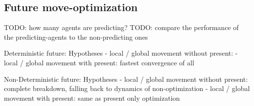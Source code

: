\subsection{Future move-optimization}
TODO: how many agents are predicting?
TODO: compare the performance of the predicting-agents to the non-predicting ones

Deterministic future:
	Hypotheses
		- local / global movement without present:  
		- local / global movement with present: fastest convergence of all
		
Non-Deterministic future:
	Hypotheses
		- local / global movement without present: complete breakdown, falling back to dynamics of non-optimization
		- local / global movement with present: same as present only optimization